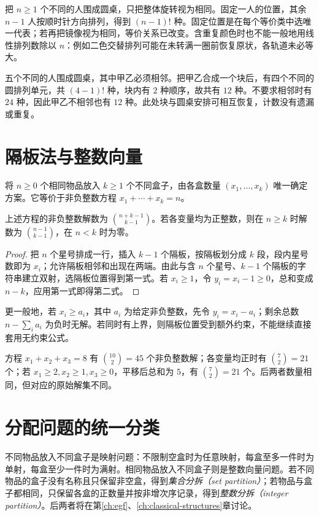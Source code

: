 把 $n\ge1$ 个不同的人围成圆桌，只把整体旋转视为相同。固定一人的位置，其余 $n-1$ 人按顺时针方向排列，得到 $(n-1)!$ 种。固定位置是在每个等价类中选唯一代表；若再把镜像视为相同，等价关系已改变。含重复颜色时也不能一般地用线性排列数除以 $n$：例如二色交替排列可能在未转满一圈前恢复原状，各轨道未必等大。

\begin{example}
五个不同的人围成圆桌，其中甲乙必须相邻。把甲乙合成一个块后，有四个不同的圆排列单元，共 $(4-1)!$ 种，块内有 $2$ 种顺序，故共有 $12$ 种。不要求相邻时有 $24$ 种，因此甲乙不相邻也有 $12$ 种。此处块与圆桌安排可相互恢复，计数没有遗漏或重复。
\end{example}

\section{隔板法与整数向量}

将 $n\ge0$ 个相同物品放入 $k\ge1$ 个不同盒子，由各盒数量 $(x_1,\ldots,x_k)$ 唯一确定方案。它等价于非负整数方程 $x_1+\cdots+x_k=n$。

\begin{theorem}
上述方程的非负整数解数为 $\binom{n+k-1}{k-1}$。若各变量均为正整数，则在 $n\ge k$ 时解数为 $\binom{n-1}{k-1}$，在 $n<k$ 时为零。
\end{theorem}
\begin{proof}
把 $n$ 个星号排成一行，插入 $k-1$ 个隔板，按隔板划分成 $k$ 段，段内星号数即为 $x_i$；允许隔板相邻和出现在两端。由此与含 $n$ 个星号、$k-1$ 个隔板的字符串建立双射，选隔板位置得到第一式。若 $x_i\ge1$，令 $y_i=x_i-1\ge0$，总和变成 $n-k$，应用第一式即得第二式。
\end{proof}

更一般地，若 $x_i\ge a_i$，其中 $a_i$ 为给定非负整数，先令 $y_i=x_i-a_i$；剩余总数 $n-\sum_i a_i$ 为负时无解。若同时有上界，则隔板位置受到额外约束，不能继续直接套用无约束公式。

\begin{example}
方程 $x_1+x_2+x_3=8$ 有 $\binom{10}{2}=45$ 个非负整数解；各变量均正时有 $\binom72=21$ 个；若 $x_1\ge2,x_2\ge1,x_3\ge0$，平移后总和为 $5$，有 $\binom72=21$ 个。后两者数量相同，但对应的原始解集不同。
\end{example}

\section{分配问题的统一分类}

不同物品放入不同盒子是映射问题：不限制空盒时为任意映射，每盒至多一件时为单射，每盒至少一件时为满射。相同物品放入不同盒子则是整数向量问题。若不同物品的盒子没有名称且只保留非空盒，得到\emph{集合分拆（set partition）}；若物品与盒子都相同，只保留各盒的正数量并按非增次序记录，得到\emph{整数分拆（integer partition）}。后两者将在第\ref{ch:egf}、\ref{ch:classical-structures}章讨论。

